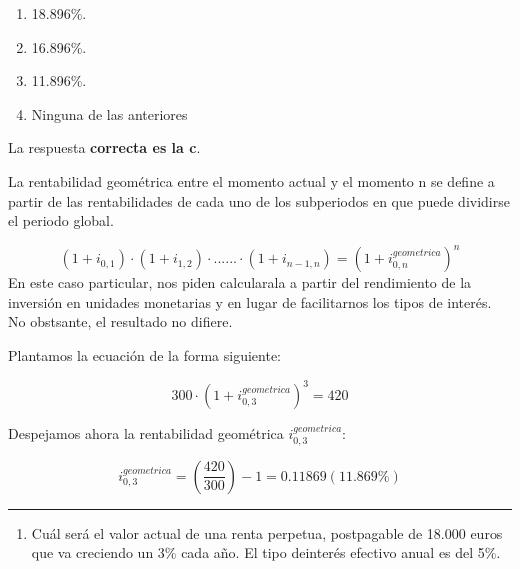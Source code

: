 \documentclass[
  letterpaper,
  DIV=11,
  numbers=noendperiod]{scrreprt}
\providecommand{\tightlist}{%
  \setlength{\itemsep}{0pt}\setlength{\parskip}{0pt}}\usepackage{longtable,booktabs,array}
\begin{document}
\begin{enumerate}
\def\labelenumi{\alph{enumi}.}
\item
  18.896\%.
\item
  16.896\%.
\item
  11.896\%.
\item
  Ninguna de las anteriores
\end{enumerate}

\begin{tcolorbox}[enhanced jigsaw, left=2mm, opacityback=0, colback=white, breakable, arc=.35mm, bottomrule=.15mm, rightrule=.15mm, toprule=.15mm, leftrule=.75mm, colframe=quarto-callout-tip-color-frame]
\begin{minipage}[t]{5.5mm}
\textcolor{quarto-callout-tip-color}{\faLightbulb}
\end{minipage}%
\begin{minipage}[t]{\textwidth - 5.5mm}

La respuesta \textbf{correcta es la c}.

La rentabilidad geométrica entre el momento actual y el momento n se
define a partir de las rentabilidades de cada uno de los subperiodos en
que puede dividirse el periodo global.

\[\left(1+i_{0,1}\right)\cdot\left(1+i_{1,2}\right)\cdot......\cdot\left(1+i_{n-1,n}\right)=\left(1+i_{0,n}^{geometrica}\right)^n\]
En este caso particular, nos piden calcularala a partir del rendimiento
de la inversión en unidades monetarias y en lugar de facilitarnos los
tipos de interés. No obstsante, el resultado no difiere.

Plantamos la ecuación de la forma siguiente:

\[300\cdot\left(1+i_{0,3}^{geometrica}\right)^{3}=420\]

Despejamos ahora la rentabilidad geométrica \(i_{0,3}^{geometrica}\):

\[i_{0,3}^{geometrica}=\left(\frac{420}{300}\right)-1=0.11869\left(11.869\%\right)\]

\end{minipage}%
\end{tcolorbox}

\begin{center}\rule{0.5\linewidth}{0.5pt}\end{center}

\begin{enumerate}
\def\labelenumi{\arabic{enumi}.}
\setcounter{enumi}{88}
\tightlist
\item
  Cuál será el valor actual de una renta perpetua, postpagable de 18.000
  euros que va creciendo un 3\% cada año. El tipo deinterés efectivo
  anual es del 5\%.
\end{enumerate}
\end{document}
